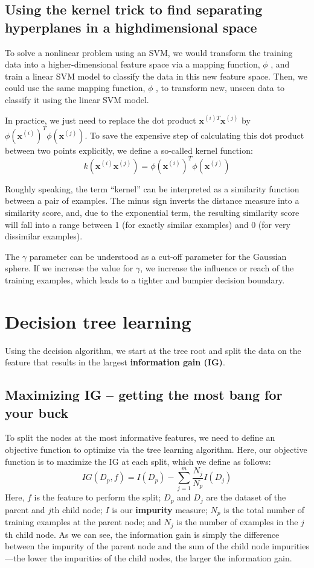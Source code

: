 \subsection{Using the kernel trick to find separating hyperplanes in a highdimensional space}
To solve a nonlinear problem using an SVM, we would transform the training data into a higher-dimensional feature space via a mapping function, $\phi$ , and train a linear SVM model to classify the data in this new feature space. Then, we could use the same mapping function, $\phi$ , to transform new, unseen data to classify it using the linear SVM model.

In practice, we just need to replace the dot product $\textbf{x}^{(i)T}\textbf{x}^{(j)}$ by $\phi(\textbf{x}^{(i)})^T\phi(\textbf{x}^{(j)})$. To save the expensive step of calculating this dot product between two points explicitly, we define a so-called kernel function:
$$k(\textbf{x}^{(i)}\textbf{x}^{(j)})=\phi(\textbf{x}^{(i)})^T\phi(\textbf{x}^{(j)})$$

Roughly speaking, the term “kernel” can be interpreted as a similarity function between a pair of examples. The minus sign inverts the distance measure into a similarity score, and, due to the exponential term, the resulting similarity score will fall into a range between 1 (for exactly similar examples) and 0 (for very dissimilar examples).

The $\gamma$ parameter can be understood as a cut-off parameter for the Gaussian sphere. If we increase the value for $\gamma$, we increase the influence or reach of the training examples, which leads to a tighter and bumpier decision boundary.

\section{Decision tree learning}
Using the decision algorithm, we start at the tree root and split the data on the feature that results in the largest \textbf{information gain (IG)}.
\subsection{Maximizing IG – getting the most bang for your buck}
To split the nodes at the most informative features, we need to define an objective function to optimize via the tree learning algorithm. Here, our objective function is to maximize the IG at each split, which we define as follows:
\begin{equation}
    IG(D_p,f)=I(D_p)-\sum_{j=1}^{m}\frac{N_j}{N_p}I(D_j)
\end{equation}
Here, $f$ is the feature to perform the split; $D_p$ and $D_j$ are the dataset of the parent and $j$th child node; $I$ is our \textbf{impurity} measure; $N_p$ is the total number of training examples at the parent node; and $N_j$ is the number of examples in the $j$th child node. As we can see, the information gain is simply the difference between the impurity of the parent node and the sum of the child node impurities—the lower the impurities of the child nodes, the larger the information gain.

